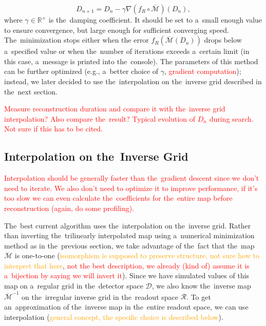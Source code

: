 				\begin{equation}
					D_{n+1} = D_n - \gamma \nabla(f_R\circ\overbar{\mathcal{M}})(D_n),
				\end{equation}
			where $\gamma\in\mathbb{R}^+$ is the~damping coefficient. It should be set to a~small enough value to ensure convergence, but large enough for sufficient converging speed. The~minimization stops either when the error $f_R(\overbar{\mathcal{M}}(D_n))$ drops below a~specified value or when the~number of iterations exceeds a~certain limit (in this case, a~message is printed into the~console).
			The parameters of this method can be further optimized (e.g., a~better choice of $\gamma$, \textcolor{red}{gradient computation}); instead, we later decided to use the~interpolation on the~inverse grid described in the~next section.
			
			\textcolor{red}{Measure reconstruction duration and compare it with the~inverse grid interpolation? Also compare the~result? Typical evolution of $D_n$ during search. Not sure if this has to be cited.}
		
		\subsection{Interpolation on the~Inverse Grid}
		\label{sec:interpol}			
			\textcolor{red}{Interpolation should be generally faster than the~gradient descent since we don't need to iterate. We also don't need to optimize it to improve performance, if it's too slow we can even calculate the~coefficients for the~entire map before reconstruction (again, do some profiling).}
			
			The~best current algorithm uses the~interpolation on the~inverse grid. Rather than inverting the~trilinearly interpolated map using a~numerical minimization method as in the~previous section, we take advantage of the~fact that the~map $\overbar{\mathcal{M}}$ is one-to-one (\textcolor{orange}{isomorphism is supposed to preserve structure, not sure how to interpret that here}, \textcolor{red}{not the best description, we already (kind of) assume it is a~bijection by saying we will invert it}). Since we have simulated values of this map on a~regular grid in the~detector space $\mathcal{D}$, we also know the~inverse map $\overbar{\mathcal{M}}^{-1}$ on the~irregular inverse grid in the~readout space $\mathcal{R}$. To get an~approximation of the~inverse map in the~entire readout space, we can use interpolation (\textcolor{orange}{general concept, the specific choice is described below}).
			

